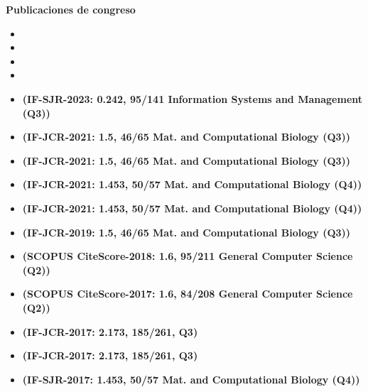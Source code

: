 \textbf{Publicaciones de congreso}
\begin{itemize}
 \item {} %
 \item {} %
 \item {}
 \item {} 
 \item {} \textbf{(IF-SJR-2023: 0.242, 95/141 Information Systems and Management (Q3))} %
 \item {} \textbf{(IF-JCR-2021: 1.5, 46/65 Mat. and Computational Biology (Q3))} %
 \item {} \textbf{(IF-JCR-2021: 1.5, 46/65 Mat. and Computational Biology (Q3))} %
 \item {} \textbf{(IF-JCR-2021: 1.453, 50/57 Mat. and Computational Biology (Q4))}
 \item {} \textbf{(IF-JCR-2021: 1.453, 50/57 Mat. and Computational Biology (Q4))}
 \item {} \textbf{(IF-JCR-2019: 1.5, 46/65 Mat. and Computational Biology (Q3))}
 \item {} \textbf{(SCOPUS CiteScore-2018: 1.6, 95/211 General Computer Science (Q2))}
 \item {} \textbf{(SCOPUS CiteScore-2017: 1.6, 84/208 General Computer Science (Q2))}
 \item {} \textbf{(IF-JCR-2017: 2.173, 185/261, Q3)}
 \item {} \textbf{(IF-JCR-2017: 2.173, 185/261, Q3)}
 \item {} \textbf{(IF-SJR-2017: 1.453, 50/57 Mat. and Computational Biology (Q4))}
\end{itemize}


